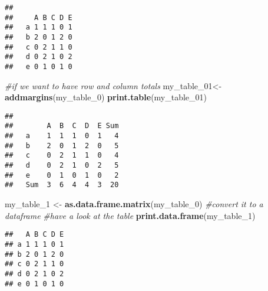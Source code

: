 \documentclass[]{article}
\newenvironment{Shaded}{\begin{snugshade}}{\end{snugshade}}
\newcommand{\CommentTok}[1]{\textcolor[rgb]{0.56,0.35,0.01}{\textit{#1}}}
\newcommand{\DataTypeTok}[1]{\textcolor[rgb]{0.13,0.29,0.53}{#1}}
\newcommand{\DecValTok}[1]{\textcolor[rgb]{0.00,0.00,0.81}{#1}}
\newcommand{\KeywordTok}[1]{\textcolor[rgb]{0.13,0.29,0.53}{\textbf{#1}}}
\newcommand{\NormalTok}[1]{#1}
\newcommand{\OperatorTok}[1]{\textcolor[rgb]{0.81,0.36,0.00}{\textbf{#1}}}
\newcommand{\StringTok}[1]{\textcolor[rgb]{0.31,0.60,0.02}{#1}}
\begin{document}
\begin{Shaded}
\end{Shaded}

\begin{verbatim}
##    
##     A B C D E
##   a 1 1 1 0 1
##   b 2 0 1 2 0
##   c 0 2 1 1 0
##   d 0 2 1 0 2
##   e 0 1 0 1 0
\end{verbatim}

\begin{Shaded}
\begin{Highlighting}[]
\CommentTok{#if we want to have row and column totals}
\NormalTok{my_table_}\DecValTok{01}\NormalTok{<-}\StringTok{ }\KeywordTok{addmargins}\NormalTok{(my_table_}\DecValTok{0}\NormalTok{)}
\KeywordTok{print.table}\NormalTok{(my_table_}\DecValTok{01}\NormalTok{)}
\end{Highlighting}
\end{Shaded}

\begin{verbatim}
##      
##        A  B  C  D  E Sum
##   a    1  1  1  0  1   4
##   b    2  0  1  2  0   5
##   c    0  2  1  1  0   4
##   d    0  2  1  0  2   5
##   e    0  1  0  1  0   2
##   Sum  3  6  4  4  3  20
\end{verbatim}

\begin{Shaded}
\begin{Highlighting}[]
\NormalTok{my_table_}\DecValTok{1}\NormalTok{ <-}\StringTok{ }\KeywordTok{as.data.frame.matrix}\NormalTok{(my_table_}\DecValTok{0}\NormalTok{) }\CommentTok{#convert it to a dataframe}
\CommentTok{#have a look at the table}
\KeywordTok{print.data.frame}\NormalTok{(my_table_}\DecValTok{1}\NormalTok{)}
\end{Highlighting}
\end{Shaded}

\begin{verbatim}
##   A B C D E
## a 1 1 1 0 1
## b 2 0 1 2 0
## c 0 2 1 1 0
## d 0 2 1 0 2
## e 0 1 0 1 0
\end{verbatim}

\begin{Shaded}
\end{Shaded}
\end{document}
